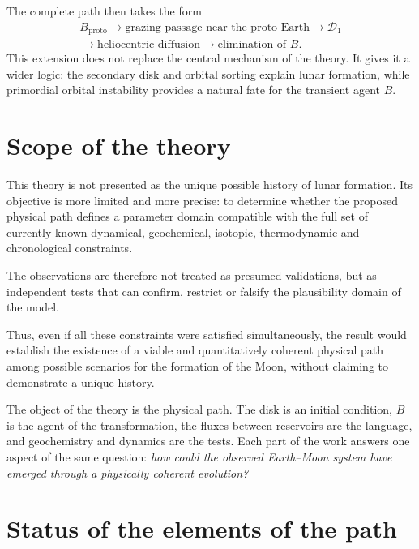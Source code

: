 \documentclass[11pt,a4paper,openany]{report}
\begin{document}
The complete path then takes the form
\begin{equation}
\boxed{\begin{gathered}
B_{\mathrm{proto}}\longrightarrow\text{grazing passage near the proto-Earth}
\longrightarrow\mathcal{D}_1\\
\longrightarrow\text{heliocentric diffusion}
\longrightarrow\text{elimination of }B.
\end{gathered}}
\label{eq:cheminB}
\end{equation}
This extension does not replace the central mechanism of the theory. It gives it a wider logic:
the secondary disk and orbital sorting explain lunar formation, while primordial orbital
instability provides a natural fate for the transient agent $B$.

\section{Scope of the theory}

This theory is not presented as the unique possible history of lunar formation. Its objective is
more limited and more precise: to determine whether the proposed physical path defines a parameter
domain compatible with the full set of currently known dynamical, geochemical, isotopic,
thermodynamic and chronological constraints.

The observations are therefore not treated as presumed validations, but as independent tests that
can confirm, restrict or falsify the plausibility domain of the model.

Thus, even if all these constraints were satisfied simultaneously, the result would establish the
existence of a viable and quantitatively coherent physical path among possible scenarios for the
formation of the Moon, without claiming to demonstrate a unique history.

\begin{ideephys}
The object of the theory is the physical path. The disk is an initial condition, $B$ is the agent
of the transformation, the fluxes between reservoirs are the language, and geochemistry and
dynamics are the tests. Each part of the work answers one aspect of the same question:
\emph{how could the observed Earth--Moon system have emerged through a physically coherent
evolution?}
\end{ideephys}

\section{Status of the elements of the path}
\end{document}
